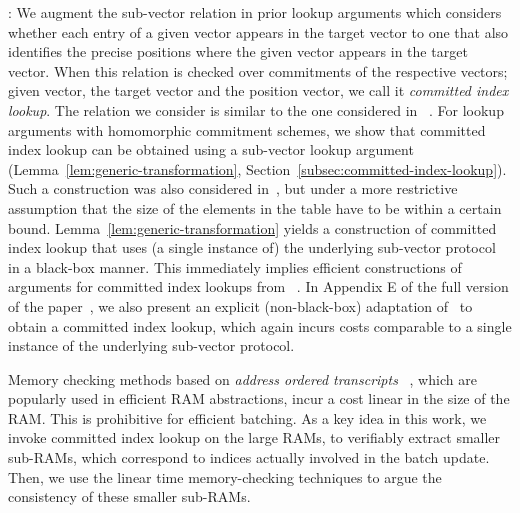 \smallskip

: We augment the sub-vector relation in prior lookup arguments which
considers whether each entry of a given vector appears in the target vector to one that also identifies
the precise positions where the given vector appears in the target vector. When this relation is checked
over commitments of the respective vectors; given vector, the target vector and the position vector, we call
it {\em committed index lookup}. The relation we consider is similar to the one considered in ~\cite{lasso}.
For lookup arguments with homomorphic commitment schemes, we show that committed index lookup can be obtained
using a sub-vector lookup argument (Lemma~\ref{lem:generic-transformation}, Section~\ref{subsec:committed-index-lookup}). Such a construction was
also considered in~\cite{lasso}, but under a more restrictive assumption that the size of the elements in the table have to be
within a certain bound. Lemma~\ref{lem:generic-transformation} yields a construction of committed index lookup that uses (a single instance of) the underlying sub-vector protocol in a black-box manner. This immediately implies
efficient constructions of arguments for committed index lookups from
~\cite{CCS:ZBKMNS22,EPRINT:PosKat22,EPRINT:ZGKMR22,EPRINT:EagFioGab22,PKC:CFFLL24}. In Appendix E of the full version of the paper~\cite{full-ver}, we also present an explicit (non-black-box) adaptation of~\cite{EPRINT:PosKat22} to obtain a committed index lookup, which again incurs costs comparable to a single instance of the underlying sub-vector protocol.

\smallskip


Memory checking methods based on {\em address ordered transcripts}
~\cite{NDSS:WSRBW15,USENIX:BCTV14,C:BCGTV13,SP:ZGKPP18}, which are popularly used in
efficient RAM abstractions, incur a cost linear in the size of the RAM. This is prohibitive for efficient batching. As a key idea in this work, we invoke committed index lookup on
the large RAMs, to verifiably extract smaller sub-RAMs, which correspond to indices actually involved in
the batch update. Then, we use the linear time memory-checking techniques to argue the consistency of these
smaller sub-RAMs. 

